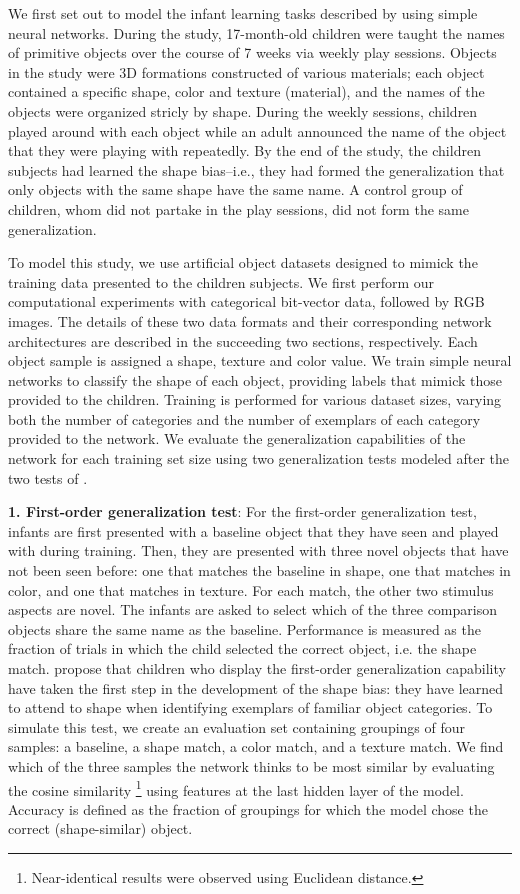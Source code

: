 We first set out to model the infant learning tasks described by
\cite{Smith2002} using simple neural networks. During the study, 17-month-old
children were taught the names of primitive objects over the course of 7 weeks
via weekly play sessions. Objects in the study were 3D formations constructed of
various materials; each object contained a specific shape, color
and texture (material), and the names of the objects were organized stricly
by shape. During the weekly sessions, children played around with each object
while an adult announced the name of the object that they were playing with
repeatedly. By the end of the study, the children subjects had learned the
shape bias--i.e., they had formed the generalization that only objects with
the same shape have the same name. A control group of children, whom did not
partake in the play sessions, did not form the same generalization.

To model this study, we use artificial object datasets designed to
mimick the training data presented to the children subjects. We first perform
our computational experiments with categorical bit-vector data, followed by
RGB images. The details of these two data formats and their corresponding network
architectures are described in the succeeding two sections, respectively. Each object sample is
assigned a shape, texture and color value. We train simple neural networks to
classify the shape of each object, providing labels that mimick
those provided to the children. Training is performed for various dataset sizes,
varying both the number of categories and the number of exemplars of each
category provided to the network. We evaluate the generalization capabilities
of the network for each training set size using two generalization tests
modeled after the two tests of \cite{Smith2002}.

{\bf1. First-order generalization test}: For the first-order generalization
test, infants are first presented with a baseline object that they have seen and
played with during training. Then, they are presented with three novel objects
that have not been seen before: one that matches the baseline in shape, one
that matches in color, and one that matches in texture. For each match,
the other two stimulus aspects are novel. The infants are asked to select
which of the three comparison objects share the same name as the baseline.
Performance is measured as the fraction of trials in which the child
selected the correct object, i.e. the shape match. \cite{Smith2002} propose
that children who display the first-order generalization capability have taken the first
step in the development of the shape bias: they have learned to attend to
shape when identifying exemplars of familiar object categories.
To simulate this test, we create an evaluation set containing groupings of four samples: a baseline, a
shape match, a color match, and a texture match. We find which of the three
samples the network thinks to be most similar by evaluating the cosine similarity
\footnote{Near-identical results were observed using Euclidean distance.}
using features at the last hidden layer of the model. Accuracy is defined as
the fraction of groupings for which the model chose the correct (shape-similar)
object.

